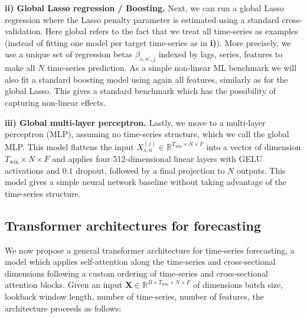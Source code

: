 \documentclass{article}
\begin{document}
\textbf{ii) Global Lasso regression / Boosting.}
Next, we can run a global Lasso regression  where the Lasso penalty parameter is estimated using a standard cross-validation. Here global refers to the fact that we treat all time-series as examples (instead of fitting one model per target time-series as in \textbf{i)}). More precisely, we use a unique set of regression betas $\beta_{s,n',j}$ indexed by lags, series, features to make all $N$ time-series prediction. As a simple non-linear ML benchmark we will also fit a standard boosting model using again all features, similarly as for the global Lasso. This gives a standard benchmark which has the possibility of capturing non-linear effects.

\textbf{iii) Global multi-layer perceptron.}
Lastly, we move to a multi-layer perceptron (MLP), assuming no time-series structure, which we call the global MLP.
This model flattens the input $X_{s,n}^{(j)} \in \mathbb{R}^{T_{\text{win}} \times N \times F}$ into a vector of dimension $T_{\text{win}} \times N \times F$ and applies four 512-dimensional linear layers with GELU activations and $0.1$ dropout, followed by a final projection to $N$ outputs. This model gives a simple neural network baseline without taking advantage of the time-series structure.



\subsection{Transformer architectures for forecasting}\label{subsec_models}


We now propose a general transformer architecture for time-series forecasting, a model which applies self-attention along the time-series and cross-sectional dimensions following a custom ordering of time-series and cross-sectional attention blocks. Given an  input $\mathbf{X} \in \mathbb{R}^{B \times T_{\text{win}} \times N \times F}$ of dimensions batch size, lookback window length, number of time-series, number of features, the architecture proceeds as follows:
\end{document}
